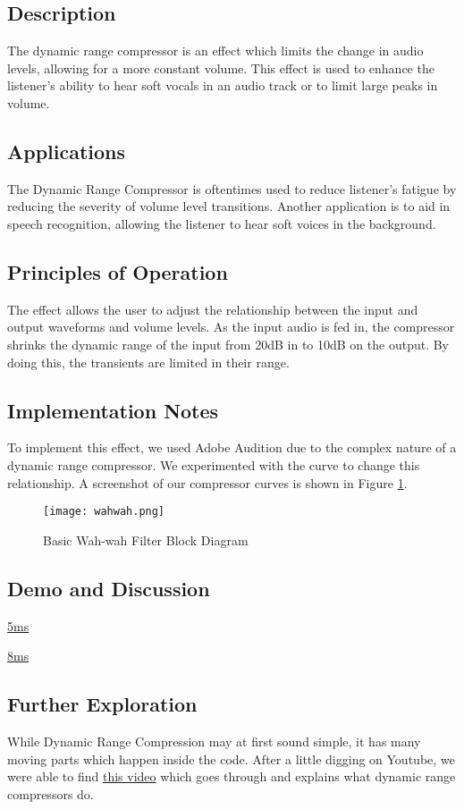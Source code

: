 \subsection{Description}
The dynamic range compressor is an effect which limits the change in audio levels, allowing for a more constant volume. This effect is used to enhance the listener's ability to hear soft vocals in an audio track or to limit large peaks in volume.

\subsection{Applications}
The Dynamic Range Compressor is oftentimes used to reduce listener's fatigue by reducing the severity of volume level transitions. Another application is to aid in speech recognition, allowing the listener to hear soft voices in the background. 

\subsection{Principles of Operation}
The effect allows the user to adjust the relationship between the input and output waveforms and volume levels. As the input audio is fed in, the compressor shrinks the dynamic range of the input from 20dB in to 10dB on the output. By doing this, the transients are limited in their range.

\subsection{Implementation Notes}
To implement this effect, we used Adobe Audition due to the complex nature of a dynamic range compressor. We experimented with the curve to change this relationship. A screenshot of our compressor curves is shown in Figure \ref{fig:Wahwah-block-diagram}.
\begin{figure}[ht]
	\centering
	\texttt{[image: wahwah.png]}
	\caption{Basic Wah-wah Filter Block Diagram}
	\label{fig:Wahwah-block-diagram}
\end{figure}


\subsection{Demo and Discussion}

\href{run:../OutputAudio/WahWah_22-004 Original Guitar_{freq=10Hz}{delay_max=5ms}.wav}{5ms}

\href{run:../OutputAudio/WahWah_22-004 Original Guitar_{freq=10Hz}{delay_max=8ms}.wav}{8ms}





\subsection{Further Exploration}
While Dynamic Range Compression may at first sound simple, it has many moving parts which happen inside the code. After a little digging on Youtube, we were able to find \href{https://www.youtube.com/watch?v=dd4ujGjlX1k}{this video} which goes through and explains what dynamic range compressors do.